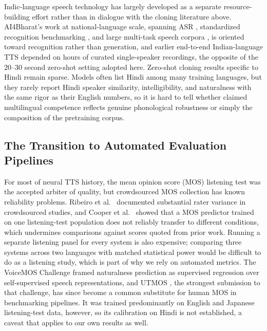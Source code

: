 \documentclass[conference]{IEEEtran}
\begin{document}
Indic-language speech technology has largely developed as a separate
resource-building effort rather than in dialogue with the cloning literature
above. AI4Bharat's work at national-language scale, spanning ASR
\cite{javed2022towards}, standardized recognition benchmarking
\cite{bhogale2023vistaar}, and large multi-task speech corpora
\cite{javed2024indicvoices}, is oriented toward recognition rather than
generation, and earlier end-to-end Indian-language TTS
\cite{prakash2019building} depended on hours of curated single-speaker
recordings, the opposite of the 20--30 second zero-shot setting adopted here.
Zero-shot cloning results specific to Hindi remain sparse. Models often list
Hindi among many training languages, but they rarely report Hindi speaker
similarity, intelligibility, and naturalness with the same rigor as their
English numbers, so it is hard to tell whether claimed multilingual
competence reflects genuine phonological robustness or simply the composition
of the pretraining corpus.

\subsection{The Transition to Automated Evaluation Pipelines}
\label{sec:related-evaluation}

For most of neural TTS history, the mean opinion score (MOS) listening test
was the accepted arbiter of quality, but crowdsourced MOS collection has
known reliability problems. Ribeiro et al.~\cite{ribeiro2011crowdmos}
documented substantial rater variance in crowdsourced studies, and Cooper et
al.~\cite{cooper2022generalization} showed that a MOS predictor trained on
one listening-test population does not reliably transfer to different
conditions, which undermines comparisons against scores quoted from prior
work. Running a separate listening panel for every system is also expensive;
comparing three systems across two languages with matched statistical power
would be difficult to do as a listening study, which is part of why we rely
on automated metrics. The VoiceMOS Challenge \cite{huang2022voicemos} framed
naturalness prediction as supervised regression over self-supervised speech
representations, and UTMOS \cite{saeki2022utmos}, the strongest submission to
that challenge, has since become a common substitute for human MOS in
benchmarking pipelines. It was trained predominantly on English and Japanese
listening-test data, however, so its calibration on Hindi is not established,
a caveat that applies to our own results as well.
\end{document}
